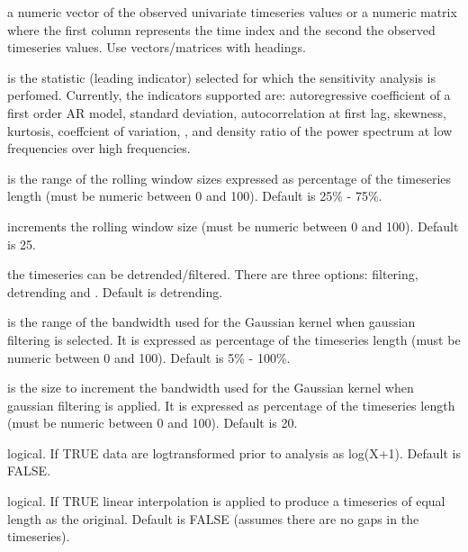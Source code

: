 \documentclass[a4paper]{book}
\begin{document}
\begin{Arguments}
\begin{ldescription}
\item[\code{timeseries}] a numeric vector of the observed
univariate timeseries values or a numeric matrix where
the first column represents the time index and the second
the observed timeseries values. Use vectors/matrices with
headings.

\item[\code{indicator}] is the statistic (leading indicator)
selected for which the sensitivity analysis is perfomed.
Currently, the indicators supported are: 
autoregressive coefficient of a first order AR model,
 standard deviation,  autocorrelation
at first lag,  skewness,  kurtosis,
 coeffcient of variation, , and
 density ratio of the power spectrum at
low frequencies over high frequencies.

\item[\code{winsizerange}] is the range of the rolling window
sizes expressed as percentage of the timeseries length
(must be numeric between 0 and 100). Default is 25\% -
75\%.

\item[\code{incrwinsize}] increments the rolling window size
(must be numeric between 0 and 100). Default is 25.

\item[\code{detrending}] the timeseries can be
detrended/filtered. There are three options:
 filtering,  detrending and
. Default is 
detrending.

\item[\code{bandwidthrange}] is the range of the bandwidth used
for the Gaussian kernel when gaussian filtering is
selected. It is expressed as percentage of the timeseries
length (must be numeric between 0 and 100). Default is
5\% - 100\%.

\item[\code{incrbandwidth}] is the size to increment the
bandwidth used for the Gaussian kernel when gaussian
filtering is applied. It is expressed as percentage of
the timeseries length (must be numeric between 0 and
100). Default is 20.

\item[\code{logtransform}] logical. If TRUE data are
logtransformed prior to analysis as log(X+1). Default is
FALSE.

\item[\code{interpolate}] logical. If TRUE linear interpolation
is applied to produce a timeseries of equal length as the
original. Default is FALSE (assumes there are no gaps in
the timeseries).
\end{ldescription}
\end{Arguments}
\end{document}
